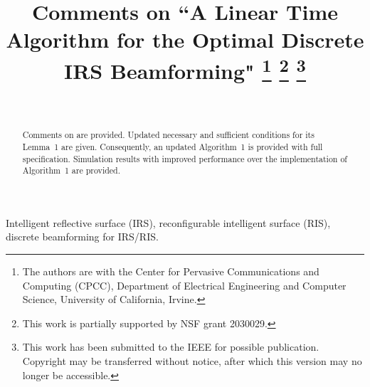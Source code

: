 \documentclass[conference]{IEEEtran}
\begin{document}
\title{Comments on ``A Linear Time Algorithm for the Optimal Discrete IRS Beamforming"
\thanks{The authors are with the Center for Pervasive Communications and Computing (CPCC), Department of Electrical Engineering and Computer Science,
University of California, Irvine.}
\thanks{This work is partially supported by NSF grant 2030029.}
\thanks{This work has been submitted to the IEEE for possible publication. Copyright may be transferred without notice, after which this version may no longer be accessible.}
}

\ifCLASSOPTIONonecolumn
\author{\IEEEauthorblockN{Dogan Kutay Pekcan, %
}
\and
{}\\
}
\else
\author{
}
\fi

\maketitle

\begin{abstract}
Comments on \cite{b1} are provided. Updated necessary and sufficient conditions for its Lemma~1 are given.
Consequently, an updated Algorithm~1 is provided with full specification. Simulation results with improved
performance over the implementation of Algorithm~1 are provided.
\end{abstract}
\begin{IEEEkeywords}
Intelligent reflective surface (IRS), reconfigurable intelligent surface (RIS), discrete beamforming for IRS/RIS.
\end{IEEEkeywords}









\end{document}
